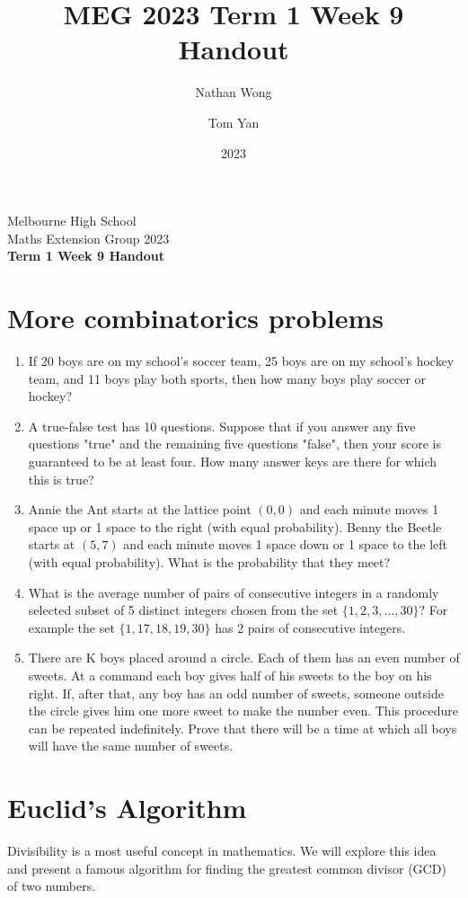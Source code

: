 \documentclass[a4paper,10pt]{article}
\title{MEG 2023 Term 1 Week 9 Handout}
\author{Nathan Wong\and Tom Yan}
\date{2023}
\newcommand{\thetitle}{Term 1 Week 9 Handout}
\begin{document}
\noindent Melbourne High School\\
Maths Extension Group 2023\\
\textbf{\thetitle}\\

\section{More combinatorics problems}
\hspace{0.5in}\begin{minipage}{5.26in}
\begin{enumerate}
\item If 20 boys are on my school's soccer team, 25 boys are on my school's hockey team, and 11 boys play both sports, then how many boys play soccer or hockey?
\item A true-false test has 10 questions. Suppose that if you answer any five questions "true" and the remaining five questions "false", then your score is guaranteed to be at least four. How many answer keys are there for which this is true?

\item Annie the Ant starts at the lattice point $(0,0)$ and each minute moves 1 space up or 1 space to the right (with equal probability). Benny the Beetle starts at $(5,7)$ and each minute moves 1 space down or 1 space to the left (with equal probability). What is the probability that they meet?
\item What is the average number of pairs of consecutive integers in a randomly selected subset of 5 distinct integers chosen from the set $\{1, 2, 3,\ldots, 30\}?$ For example the set $\{1, 17, 18, 19, 30\}$ has 2 pairs of consecutive integers.
\item  There are K boys placed around a circle. Each of them has an
even number of sweets. At a command each boy gives half of his
sweets to the boy on his right. If, after that, any boy has an odd
number of sweets, someone outside the circle gives him one more
sweet to make the number even. This procedure can be repeated
indefinitely. Prove that there will be a time at which all boys will
have the same number of sweets.
\end{enumerate}
\end{minipage}
\twocolumn
\section{Euclid's Algorithm}
Divisibility is a most useful concept in mathematics.
We will explore this idea and present a famous algorithm for finding the
greatest common divisor (GCD) of two numbers. 
\end{document}
